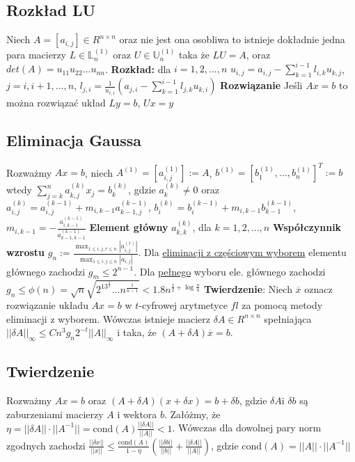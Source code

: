 \documentclass{article}
\begin{document}
\begin{minipage}[t]{.33\textwidth}
\subsection*{Rozkład LU}
Niech $A = [a_{i,j}]\in R^{n\times n}$ oraz nie jest ona osobliwa to istnieje dokładnie jedna para macierzy $L \in \mathbb{L}_n^{(1)}$ oraz $U \in \mathbb{U}_n^{(1)}$ taka że $LU = A$, oraz $det(A) = u_{11}u_{22}...u_{nn}$. \textbf{Rozkład:} dla $i=1,2,...,n$ $u_{i,j} = a_{i,j} - \sum_{k=1}^{i-1}l_{i,k}u_{k,j}$, $j = i,i+1,...,n$, $l_{j,i} = \frac{1}{u_{i,i}}\left( a_{j,i} - \sum_{k=1}^{i-1}l_{j,k}u_{k,i} \right)$ \textbf{Rozwiązanie} Jeśli $Ax =b$ to można rozwiązać układ $Ly = b$, $Ux = y$
\subsection*{Eliminacja Gaussa}
Rozważmy $Ax=b$, niech $A^{(1)}=[a_{i,j}^{(1)}] := A$, $b^{(1)} = [b_1^{(1)},...,b_n^{(1)}]^T := b$ wtedy $\sum_{j=k}^n a_{k,j}^{(k)}x_j = b_k^{(k)}$, gdzie $a_k^{(k)}\neq 0$ oraz $a_{i,j}^{(k)} = a_{i,j}^{(k-1)} + m_{i,k-1}a_{k-1,j}^{(k-1)}$, $b_i^{(k)} = b_{i}^{(k-1)} + m_{i,k-1}b_{k-1}^{(k-1)}$, $m_{i,k-1} = -\frac{a^{(k-1)}_{i,k-1}}{a^{(k-1)}_{k-1,k-1}}$ 
\textbf{Element główny} $a_{k,k}^{(k)}$, dla $k=1,2,...,n$ \textbf{Współczynnik wzrostu} $g_n := \frac{\max_{1\leq i,j,r \leq n} |a_{i,j}^{(r)}|}{\max_{1\leq i,j \leq n}|a_{i,j}|}$. Dla \underline{eliminacji z częściowym wyborem} elementu głównego zachodzi $g_m \leq 2^{n-1}$. Dla \underline{pełnego} wyboru ele. głównego zachodzi $g_n \leq \phi(n) = \sqrt{n}\sqrt{2^13^{\frac{1}{2}}...n^{\frac{1}{n-1}}} < 1.8n^{\frac{1}{2}+\log{\frac{n}{4}}}$ \textbf{Twierdzenie}: Niech $\overline{x}$ oznacz rozwiązanie układu $Ax =b$ w $t$-cyfrowej arytmetyce $fl$ za pomocą metody eliminacji z wyborem. Wówczas istnieje macierz $\delta A\in R^{n\times n}$ spełniająca $||\delta A||_\infty \leq Cn^3g_n2^{-t}||A||_\infty$ i taka, że $(A+\delta A)\overline{x} = b$.
\subsection*{Twierdzenie}
Rozważmy $Ax =b$ oraz $(A+\delta A)(x+\delta x) = b + \delta b$, gdzie $\delta A$i $\delta b$ są zaburzeniami macierzy $A$ i wektora $b$. Załóżmy, że $\eta = ||\delta A|| \cdot ||A^{-1}|| = \text{cond}(A)\frac{||\delta A||}{||A||} < 1$. Wówczas dla dowolnej pary norm zgodnych zachodzi $\frac{||\delta x||}{||x||}\leq \frac{\text{cond}(A)}{1-\eta}\left(\frac{||\delta b||}{||b||} + \frac{||\delta A||}{||A||}\right)$, gdzie $\text{cond}(A) = ||A||\cdot ||A^{-1}||$

\end{minipage}
\end{document}
